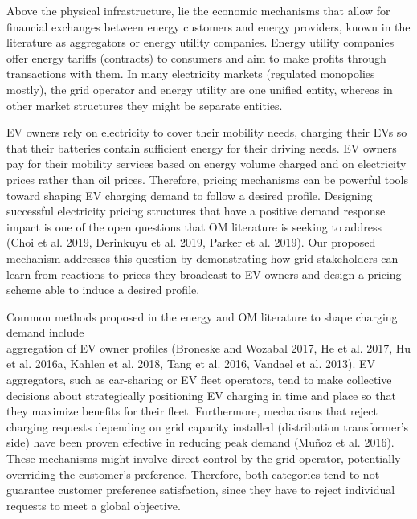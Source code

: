 \documentclass[10pt]{article}
\begin{document}
Above the physical infrastructure, lie the economic mechanisms that allow for financial exchanges between energy customers and energy providers, known in the literature as aggregators or energy utility companies. Energy utility companies offer energy tariffs (contracts) to consumers and aim to make profits through transactions with them. In many electricity markets (regulated monopolies mostly), the grid operator and energy utility are one unified entity, whereas in other market structures they might be separate entities.

EV owners rely on electricity to cover their mobility needs, charging their EVs so that their batteries contain sufficient energy for their driving needs. EV owners pay for their mobility services based on energy volume charged and on electricity prices rather than oil prices. Therefore, pricing mechanisms can be powerful tools toward shaping EV charging demand to follow a desired profile. Designing successful electricity pricing structures that have a positive demand response impact is one of the open questions that OM literature is seeking to address (Choi et al. 2019, Derinkuyu et al. 2019, Parker et al. 2019). Our proposed mechanism addresses this question by demonstrating how grid stakeholders can learn from reactions to prices they broadcast to EV owners and design a pricing scheme able to induce a desired profile.

Common methods proposed in the energy and OM literature to shape charging demand include\\
aggregation of EV owner profiles (Broneske and Wozabal 2017, He et al. 2017, Hu et al. 2016a, Kahlen et al. 2018, Tang et al. 2016, Vandael et al. 2013). EV aggregators, such as car-sharing or EV fleet operators, tend to make collective decisions about strategically positioning EV charging in time and place so that they maximize benefits for their fleet. Furthermore, mechanisms that reject charging requests depending on grid capacity installed (distribution transformer's side) have been proven effective in reducing peak demand (Muñoz et al. 2016). These mechanisms might involve direct control by the grid operator, potentially overriding the customer's preference. Therefore, both categories tend to not guarantee customer preference satisfaction, since they have to reject individual requests to meet a global objective.
\end{document}
